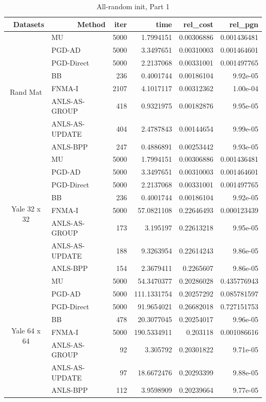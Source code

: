 \documentclass[conference,onecolumn,12pt]{IEEEtran}
\numberwithin{equation}{section}
\numberwithin{figure}{section}
\numberwithin{table}{section}
\theoremstyle{definition}
\begin{document}
\begin{table}[htbp]
	\centering
	\caption{All-random init, Part 1}
	  \begin{tabular}{clrrrr}
		\toprule
	  \multicolumn{1}{r}{Datasets} & \multicolumn{1}{r}{Method} & iter  & time  & rel\_cost & rel\_pgn \\
	  \midrule
	  \multirow{8}[0]{*}{Rand Mat} & MU    & 5000  & 1.7994151 & 0.00306886 & 0.001436481 \\
			& PGD-AD & 5000  & 3.3497651 & 0.00310003 & 0.001464601 \\
			& PGD-Direct & 5000  & 2.2137068 & 0.00331001 & 0.001497765 \\
			& BB    & 236   & 0.4001744 & 0.00186104 & 9.92e-05 \\
			& FNMA-I & 2107  & 4.1017117 & 0.00312362 & 1.00e-04 \\
			& ANLS-AS-GROUP & 418   & 0.9321975 & 0.00182876 & 9.95e-05 \\
			& ANLS-AS-UPDATE & 404   & 2.4787843 & 0.00144654 & 9.99e-05 \\
			& ANLS-BPP & 247   & 0.4886891 & 0.00253442 & 9.93e-05 \\
			\midrule
	  \multirow{8}[0]{*}{Yale 32 x 32} & MU    & 5000  & 1.7994151 & 0.00306886 & 0.001436481 \\
			& PGD-AD & 5000  & 3.3497651 & 0.00310003 & 0.001464601 \\
			& PGD-Direct & 5000  & 2.2137068 & 0.00331001 & 0.001497765 \\
			& BB    & 236   & 0.4001744 & 0.00186104 & 9.92e-05 \\
			& FNMA-I & 5000  & 57.0821108 & 0.22646493 & 0.000123439 \\
			& ANLS-AS-GROUP & 173   & 3.195197 & 0.22613218 & 9.95e-05 \\
			& ANLS-AS-UPDATE & 188   & 9.3263954 & 0.22614243 & 9.86e-05 \\
			& ANLS-BPP & 154   & 2.3679411 & 0.2265607 & 9.86e-05 \\
			\midrule
	  \multirow{8}[0]{*}{Yale 64 x 64} & MU    & 5000  & 54.3470377 & 0.20286028 & 0.435776943 \\
			& PGD-AD & 5000  & 111.1331754 & 0.20257292 & 0.085781597 \\
			& PGD-Direct & 5000  & 91.9654021 & 0.26682018 & 0.727151753 \\
			& BB    & 478   & 20.3077045 & 0.20254017 & 9.96e-05 \\
			& FNMA-I & 5000  & 190.5334911 & 0.203118 & 0.001086616 \\
			& ANLS-AS-GROUP & 92    & 3.305792 & 0.20301822 & 9.71e-05 \\
			& ANLS-AS-UPDATE & 97    & 18.6672476 & 0.20293399 & 9.88e-05 \\
			& ANLS-BPP & 112   & 3.9598909 & 0.20239664 & 9.77e-05 \\
			\bottomrule
	  \end{tabular}%
	\label{tab:addlabel}%
  \end{table}%
\end{document}
